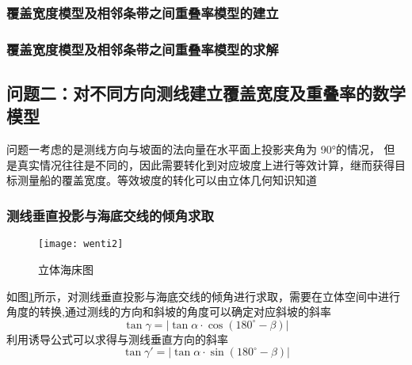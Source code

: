 \documentclass[withoutpreface,bwprint]{cumcmthesis} %
\begin{document}
\subsubsection{覆盖宽度模型及相邻条带之间重叠率模型的建立}

\subsubsection{覆盖宽度模型及相邻条带之间重叠率模型的求解}

\subsection{问题二：对不同方向测线建立覆盖宽度及重叠率的数学模型}
问题一考虑的是测线方向与坡面的法向量在水平面上投影夹角为 90°的情况，
但是真实情况往往是不同的，因此需要转化到对应坡度上进行等效计算，继而获得目标测量船的覆盖宽度。等效坡度的转化可以由立体几何知识知道
\subsubsection{测线垂直投影与海底交线的倾角求取}
\begin{figure}[!h]
    \centering
    \texttt{[image: wenti2]}
    \caption{立体海床图}
    \label{fig:3-D geology}
\end{figure}
如图\ref{fig:3-D geology}所示，对测线垂直投影与海底交线的倾角进行求取，需要在立体空间中进行角度的转换,通过测线的方向和斜坡的角度可以确定对应斜坡的斜率
$$
\tan \gamma =\left| \tan \alpha \cdot \cos \left( 180^{\circ}-\beta \right) \right|
$$ 
利用诱导公式可以求得与测线垂直方向的斜率
$$
\tan \gamma \prime=\left| \tan \alpha \cdot \sin \left( 180^{\circ}-\beta \right) \right|
$$ 
\end{document}
